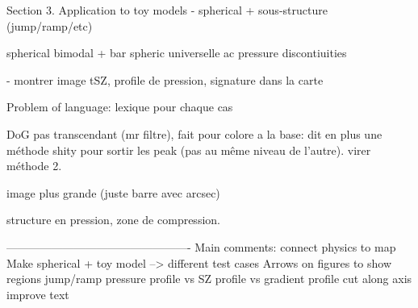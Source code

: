 Section 3. Application to toy models
	- spherical + sous-structure (jump/ramp/etc) 
	
	spherical
	bimodal + bar
	spheric universelle ac pressure discontiuities
	
	
	- montrer image tSZ, profile de pression, signature dans la carte

Problem of language: lexique pour chaque cas

DoG pas transcendant (mr filtre), fait pour colore a la base: dit en plus une méthode shity pour sortir les peak (pas au même niveau de l'autre). virer méthode 2.

image plus grande (juste barre avec arcsec)

structure en pression, zone de compression.


-------------------------------------------------
Main comments: connect physics to map
Make spherical + toy model --> different test cases
Arrows on figures to show regions
jump/ramp
pressure profile vs SZ profile vs gradient profile
cut along axis
improve text


